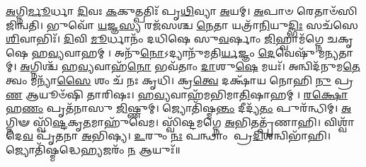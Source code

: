 \-\ul{𑌅}\-𑌗𑍍𑌨𑌿\-\ul{𑌰𑍍𑌮𑍂}\-𑌰𑍍𑌧𑌾 \ul{𑌦𑌿}\-𑌵𑌃 \ul{𑌕}\-𑌕𑍁𑌤𑍍𑌪𑌤𑌿𑌃᳴ 𑌪𑍃\-\ul{𑌥𑌿}\-𑌵𑍍𑌯𑌾 \ul{𑌅}\-𑌯𑌮𑍍। \ul{𑌅}\-𑌪𑌾𑍞 𑌰𑍇𑌤𑌾𑍞᳴𑌸𑌿 𑌜𑌿𑌨𑍍𑌵𑌤𑌿।
𑌭𑍁𑌵𑍋᳴ \ul{𑌯}\-𑌜𑍍𑌞\-\ul{𑌸𑍍𑌯} 𑌰𑌜᳴𑌸𑌶𑍍𑌚 \ul{𑌨𑍇}\-𑌤𑌾 𑌯𑌤𑍍𑌰𑌾᳴\-\ul{𑌨𑌿}\-𑌯𑍁\-\ul{𑌦𑍍𑌭𑌿𑌃} 𑌸𑌚᳴𑌸𑍇 \ul{𑌶𑌿}\-𑌵𑌾𑌭𑌿𑌃᳴।
\-\ul{𑌦𑌿}\-𑌵𑌿 \ul{𑌮𑍂}\-𑌰𑍍𑌧𑌾𑌨𑌂᳴ 𑌦𑌧𑌿𑌷𑍇 𑌸𑍁\-\ul{𑌵}\-𑌰𑍍\mbox{}𑌷𑌾𑌂 \ul{𑌜𑌿}\-𑌹𑍍𑌵𑌾𑌮᳴𑌗𑍍𑌨𑍇 𑌚𑌕𑍃𑌷𑍇 𑌹\-\ul{𑌵𑍍𑌯}\-𑌵𑌾𑌹𑌮𑍍।
𑌅𑌨𑍁᳴\-\ul{𑌨𑍋}\-𑌽𑌦𑍍𑌯𑌾𑌨𑍁᳴𑌮𑌤𑌿\-\ul{𑌰𑍍𑌯}\-𑌜𑍍𑌞𑌂 \ul{𑌦𑍇}\-𑌵𑍇𑌷𑍁᳴ 𑌮𑌨𑍍𑌯𑌤𑌾𑌮𑍍।
\-\ul{𑌅}\-𑌗𑍍𑌨𑌿𑌶𑍍𑌚᳴ 𑌹\-\ul{𑌵𑍍𑌯}\-𑌵𑌾𑌹᳴\-\ul{𑌨𑍋} 𑌭𑌵᳴𑌤𑌾𑌂 \ul{𑌦𑌾}\-𑌶𑍁\-\ul{𑌷𑍇} 𑌮𑌯𑌃᳴।
𑌅𑌨𑍍𑌵𑌿𑌦᳴𑌨𑍁𑌮\-\ul{𑌤𑍇} 𑌤𑍍𑌵𑌂 𑌮𑌨𑍍𑌯𑌾᳴\-\ul{𑌸𑍈} 𑌶𑌂 𑌚᳴ 𑌨𑌃 𑌕𑍃𑌧𑌿।
𑌕𑍍𑌰\-\ul{𑌤𑍍𑌵𑍇} 𑌦𑌕𑍍𑌷𑌾᳴𑌯 𑌨𑍋𑌹𑌿 \ul{𑌨𑍁} 𑌪𑍍𑌰\-\ul{𑌣} 𑌆𑌯𑍂𑍞᳴𑌷𑌿 𑌤𑌾𑌰𑌿𑌷𑌃।
\-\ul{𑌹}\-\-\ul{𑌵𑍍𑌯}\-𑌵𑌾𑌹᳴𑌮𑌭𑌿𑌮𑌾\-\ul{𑌤𑌿}\-𑌷𑌾𑌹𑌮𑍍। \ul{𑌰}\-\-\ul{𑌕𑍍𑌷𑍋}\-𑌹\-\ul{𑌣𑌂} 𑌪𑍃𑌤᳴𑌨𑌾𑌸𑍁 \ul{𑌜𑌿}\-𑌷𑍍𑌣𑍁𑌮𑍍।
𑌜𑍍𑌯𑍋𑌤𑌿᳴𑌷𑍍𑌮\-\ul{𑌨𑍍𑌤𑌂} 𑌦𑍀𑌦𑍍𑌯᳴\-\ul{𑌤𑌂} 𑌪𑍁𑌰᳴𑌨𑍍𑌧𑌿𑌮𑍍। \ul{𑌅}\-𑌗𑍍𑌨𑌿𑍟 𑌸𑍍𑌵𑌿᳴\-\ul{𑌷𑍍𑌟}\-𑌕𑍃\-\ul{𑌤}\-𑌮𑌾𑌹𑍁᳴𑌵𑍇𑌮।
𑌸𑍍𑌵𑌿᳴𑌷𑍍𑌟𑌮𑌗𑍍𑌨𑍇 \ul{𑌅}\-𑌭𑌿𑌤𑌤𑍍𑌪𑍃᳴𑌣𑌾𑌹𑌿। 𑌵𑌿𑌶𑍍𑌵𑌾᳴ 𑌦𑍇\-\ul{𑌵} 𑌪𑍃᳴𑌤𑌨𑌾 \ul{𑌅}\-𑌭𑌿𑌷𑍍𑌯।
\-\ul{𑌉}\-𑌰𑍁𑌂 \ul{𑌨𑌃} 𑌪𑌨𑍍𑌥𑌾𑌂 𑌪𑍍𑌰\-\ul{𑌦𑌿}\-𑌶𑌨𑍍𑌵𑌿𑌭𑌾᳴𑌹𑌿। 𑌜𑍍𑌯𑍋𑌤𑌿᳴𑌷𑍍𑌮𑌦𑍍𑌧𑍇\-\ul{𑌹𑍍𑌯}\-𑌜𑌰𑌂᳴ \ul{𑌨} 𑌆𑌯𑍁𑌃᳴॥

